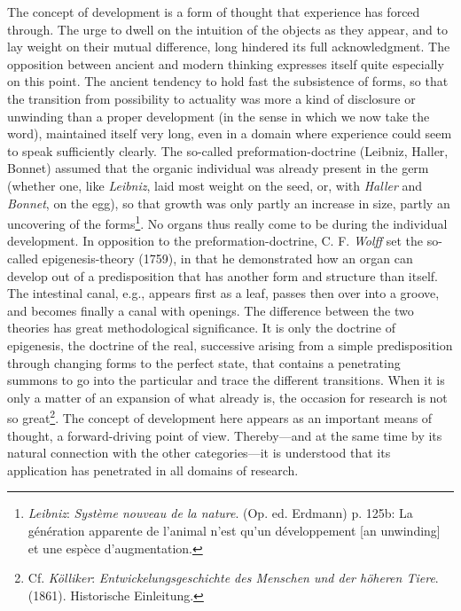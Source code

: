 \documentclass[12pt,a4paper]{book}
\newcommand{\opage}[1]{\marginnote{\footnotesize\textit{[#1]}}}
\begin{document}
The concept of development is a form of thought that experience has forced
through. The urge to dwell on the intuition of the objects as they appear,
and to lay weight on their mutual difference, long hindered its full
acknowledgment. The opposition between ancient and modern thinking expresses
itself quite especially on this point. The ancient tendency to hold fast the
subsistence of forms, so that the transition from possibility to actuality
was more a kind of disclosure or unwinding than a proper development (in the
sense in which we now take the word), maintained itself very long, even in a
domain where experience could seem to speak sufficiently clearly. The
so-called preformation-doctrine (Leibniz, Haller, Bonnet) assumed that the
organic individual was already present in the germ (whether one, like
\emph{Leibniz}, laid most weight on the seed, or, with \emph{Haller} and
\emph{Bonnet}, on the egg), so that growth was only partly an increase in
size, partly an \opage{230}uncovering of the forms\footnote{\emph{Leibniz}:
\emph{Système nouveau de la nature}. (Op. ed. Erdmann) p. 125b: La génération
apparente de l'animal n'est qu'un développement [an unwinding] et une espèce
d'augmentation.}. No organs thus really come to be during the individual
development. In opposition to the preformation-doctrine, C. F. \emph{Wolff}
set the so-called epigenesis-theory (1759), in that he demonstrated how an
organ can develop out of a predisposition that has another form and structure
than itself. The intestinal canal, e.g., appears first as a leaf, passes then
over into a groove, and becomes finally a canal with openings. The difference
between the two theories has great methodological significance. It is only
the doctrine of epigenesis, the doctrine of the real, successive arising from
a simple predisposition through changing forms to the perfect state, that
contains a penetrating summons to go into the particular and trace the
different transitions. When it is only a matter of an expansion of what
already is, the occasion for research is not so great\footnote{Cf.
\emph{Kölliker}: \emph{Entwickelungsgeschichte des Menschen und der höheren
Tiere}. (1861). Historische Einleitung.}. The concept of development here
appears as an important means of thought, a forward-driving point of view.
Thereby---and at the same time by its natural connection with the other
categories---it is understood that its application has penetrated in all
domains of research.
\end{document}
